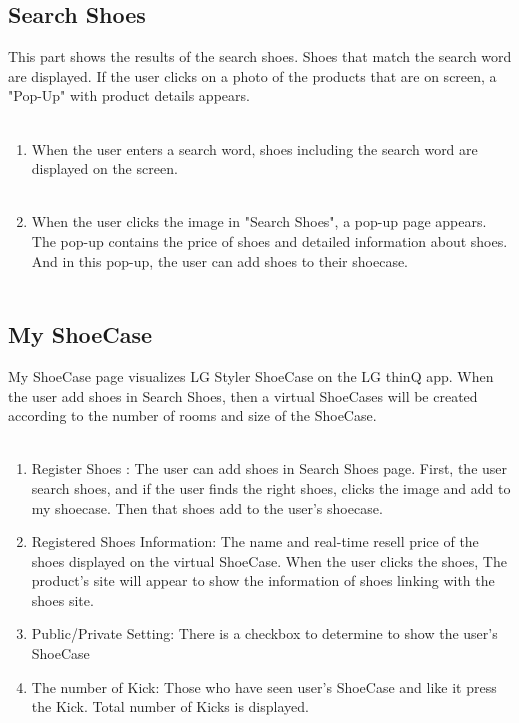 \documentclass[conference]{IEEEtran}
\begin{document}
\subsection{Search Shoes}
This part shows the results of the search shoes. Shoes that match the search word are displayed. If the user clicks on a photo of the products that are on screen, a "Pop-Up" with product details appears.\\\\
\begin{enumerate}
\item When the user enters a search word, shoes including the search word are displayed on the screen.\\\\
\item When the user clicks the image in "Search Shoes", a pop-up page appears. The pop-up contains the price of shoes and detailed information about shoes. And in this pop-up, the user can add shoes to their shoecase.\\\\
\end{enumerate}

\subsection{My ShoeCase}
My ShoeCase page visualizes LG Styler ShoeCase on the LG thinQ app. When the user add shoes in Search Shoes, then a virtual ShoeCases will be created according to the number of rooms and size of the ShoeCase.\\\\
\begin{enumerate}
    \item Register Shoes : The user can add shoes in Search Shoes page. First, the user search shoes, and if the user finds the right shoes, clicks the image and add to my shoecase. Then that shoes add to the user's shoecase.
\\
    \item Registered Shoes Information: The name and real-time resell price of the shoes displayed on the virtual ShoeCase. When the user clicks the shoes, The product’s site will appear to show the information of shoes linking with the shoes site.
\\
    \item Public/Private Setting: There is a checkbox to determine to show the user's ShoeCase
\\
    \item The number of Kick: Those who have seen user's ShoeCase and like it press the Kick. Total number of Kicks is displayed.
\\
\end{enumerate}
\end{document}
